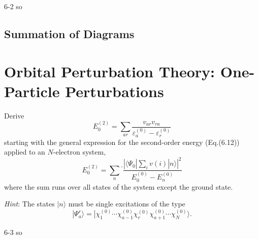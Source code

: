\documentclass[a4paper]{book}
\begin{document}
	\begin{solution}
		6-2 so
	\end{solution}
	
	\subsection{Summation of Diagrams}
	
	\section{Orbital Perturbation Theory: One-Particle Perturbations}
	
	\begin{exercise}
	Derive
	\[
		E^{(2)}_0 = \sum_{ar} \frac{v_{ar}v_{ra}}{\varepsilon^{(0)}_a - \varepsilon^{(0)}_r}
	\]
	starting with the general expression for the second-order energy (Eq.(6.12)) applied to an $N$-electron system,
	\[
		E^{(2)}_0 = \sum_n {}^\prime \frac{\left| \langle \Psi_0 | \displaystyle\sum_i v(i)| n \rangle \right|^2 }{E^{(0)}_0-E^{(0)}_n}
	\]
	where the sum runs over all states of the system except the ground state.
	
	{\it Hint}: The states $| n \rangle$ must be single excitations of the type
	\[
		|\Psi^r_a\rangle = | \chi^{(0)}_1 \cdots \chi^{(0)}_{a-1} \chi^{(0)}_{r} \chi^{(0)}_{a+1} \cdots \chi^{(0)}_{N} \rangle.
	\]
	\end{exercise}
	
	\begin{solution}
		6-3 so
	\end{solution}
	
\end{document}
